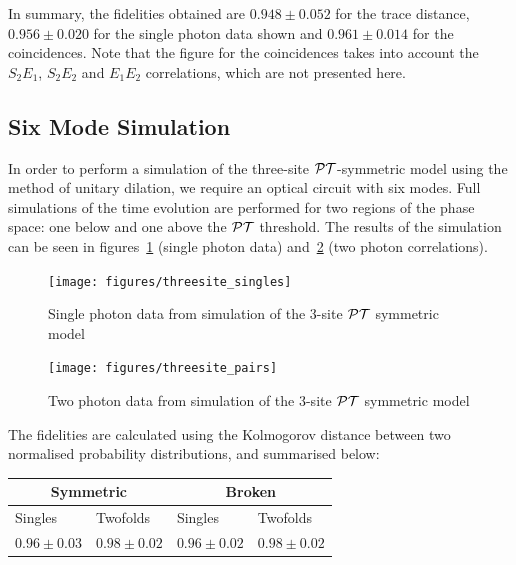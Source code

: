 In summary, the fidelities obtained are \(0.948 \pm 0.052\) for the trace
distance, \(0.956 \pm 0.020\) for the single photon data shown and \(0.961 \pm
0.014\) for the coincidences. Note that the figure for the coincidences takes
into account the \(S_2 E_1\), \(S_2 E_2\) and \(E_1 E_2\) correlations, which
are not presented here.

\subsection{Six Mode Simulation}
\label{sec:SixMode}
In order to perform a simulation of the three-site \(\mathcal{PT}\)-symmetric model using
the method of unitary dilation, we require an optical circuit with six modes.
Full simulations of the time evolution are performed for two regions of the
phase space: one below and one above the \(\mathcal{PT}\) threshold. The results of the
simulation can be seen in figures~\ref{fig:threesitesingles} (single photon
data) and~\ref{fig:threesitetwofolds} (two photon correlations).
\begin{figure}[p]
  \centering
  \texttt{[image: figures/threesite\_singles]}
  \caption[Single photon data from simulation of the 3-site PT symmetric model]
  {Single photon data from simulation of the 3-site \(\mathcal{PT}\) symmetric model}
  \label{fig:threesitesingles}
\end{figure}

\begin{figure}[p]
  \centering
  \texttt{[image: figures/threesite\_pairs]}
  \caption[Two photon data from simulation of the 3-site PT symmetric model]
  {Two photon data from simulation of the 3-site \(\mathcal{PT}\) symmetric model}
  \label{fig:threesitetwofolds}
\end{figure}

The fidelities are calculated using the Kolmogorov distance between two
normalised probability distributions, and summarised below:

\begin{tabular}{|l|l|l|l|}
  \hline
  \multicolumn{2}{|c|}{Symmetric} & \multicolumn{2}{|c|}{Broken} \\
  \hline
  Singles & Twofolds & Singles & Twofolds \\
  \hline
  \(0.96 \pm 0.03\) & \(0.98 \pm 0.02\) & \(0.96 \pm 0.02\) &
  \(0.98 \pm 0.02\) \\
  \hline
\end{tabular}


